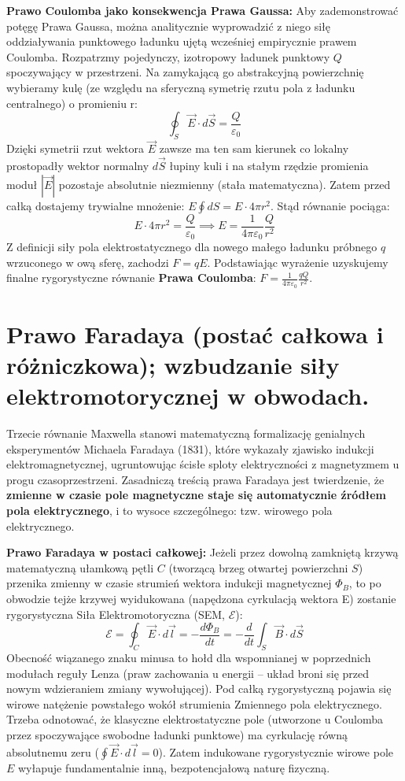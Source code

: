 \documentclass[11pt, a4paper]{article}
\begin{document}
\textbf{Prawo Coulomba jako konsekwencja Prawa Gaussa:}
Aby zademonstrować potęgę Prawa Gaussa, można analitycznie wyprowadzić z niego siłę oddziaływania punktowego ładunku ujętą wcześniej empirycznie prawem Coulomba. Rozpatrzmy pojedynczy, izotropowy ładunek punktowy $Q$ spoczywający w przestrzeni. 
Na zamykającą go abstrakcyjną powierzchnię wybieramy kulę (ze względu na sferyczną symetrię rzutu pola z ładunku centralnego) o promieniu r:
\[
\oint_S \vec{E} \cdot d\vec{S} = \frac{Q}{\varepsilon_0}
\]
Dzięki symetrii rzut wektora $\vec{E}$ zawsze ma ten sam kierunek co lokalny prostopadły wektor normalny $d\vec{S}$ łupiny kuli i na stałym rzędzie promienia moduł $|\vec{E}|$ pozostaje absolutnie niezmienny (stała matematyczna). Zatem przed całką dostajemy trywialne mnożenie: $E \oint dS = E \cdot 4\pi r^2$.
Stąd równanie pociąga:
\[
E \cdot 4\pi r^2 = \frac{Q}{\varepsilon_0} \implies E = \frac{1}{4\pi\varepsilon_0} \frac{Q}{r^2}
\]
Z definicji siły pola elektrostatycznego dla nowego małego ładunku próbnego $q$ wrzuconego w ową sferę, zachodzi $F = qE$. Podstawiając wyrażenie uzyskujemy finalne rygorystyczne równanie \textbf{Prawa Coulomba}: $F = \frac{1}{4\pi\varepsilon_0} \frac{qQ}{r^2}$.

\section{Prawo Faradaya (postać całkowa i różniczkowa); wzbudzanie siły elektromotorycznej w obwodach.}

Trzecie równanie Maxwella stanowi matematyczną formalizację genialnych eksperymentów Michaela Faradaya (1831), które wykazały zjawisko indukcji elektromagnetycznej, ugruntowując ścisłe sploty elektryczności z magnetyzmem u progu czasoprzestrzeni. Zasadniczą treścią prawa Faradaya jest twierdzenie, że \textbf{zmienne w czasie pole magnetyczne staje się automatycznie źródłem pola elektrycznego}, i to wysoce szczególnego: tzw. wirowego pola elektrycznego.

\textbf{Prawo Faradaya w postaci całkowej:}
Jeżeli przez dowolną zamkniętą krzywą matematyczną ułamkową pętli $C$ (tworzącą brzeg otwartej powierzchni $S$) przenika zmienny w czasie strumień wektora indukcji magnetycznej $\Phi_B$, to po obwodzie tejże krzywej wyidukowana (napędzona cyrkulacją wektora E) zostanie rygorystyczna Siła Elektromotoryczna (SEM, $\mathcal{E}$):
\[
\mathcal{E} = \oint_C \vec{E} \cdot d\vec{l} = - \frac{d\Phi_B}{dt} = - \frac{d}{dt} \int_S \vec{B} \cdot d\vec{S}
\]
Obecność wiązanego znaku minusa to hołd dla wspomnianej w poprzednich modułach reguły Lenza (praw zachowania u energii – układ broni się przed nowym wdzieraniem zmiany wywołującej). Pod całką rygorystyczną pojawia się wirowe natężenie powstałego wokół strumienia Zmiennego pola elektrycznego. Trzeba odnotować, że klasyczne elektrostatyczne pole (utworzone u Coulomba przez spoczywające swobodne ładunki punktowe) ma cyrkulację równą absolutnemu zeru ($\oint \vec{E} \cdot d\vec{l} = 0$). Zatem indukowane rygorystycznie wirowe pole $E$ wyłapuje fundamentalnie inną, bezpotencjałową naturę fizyczną.
\end{document}
